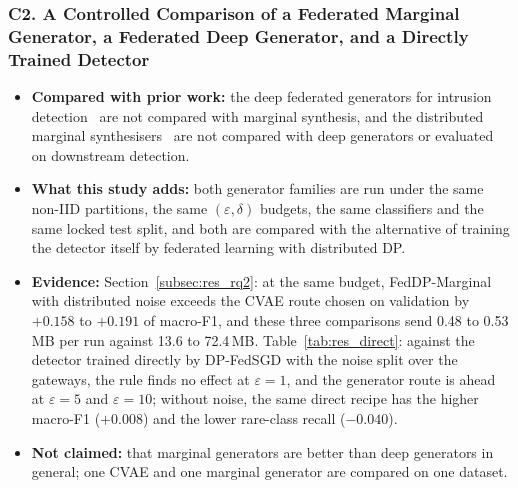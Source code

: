 \subsubsection*{C2. A Controlled Comparison of a Federated Marginal Generator, a Federated Deep Generator, and a Directly Trained Detector}
\begin{itemize}
    \item \textbf{Compared with prior work:} the deep federated generators for intrusion detection~\cite{hamouda2024, yao2024, he2023, salim2025, jiao2025, shettar2026} are not compared with marginal synthesis, and the distributed marginal synthesisers~\cite{maddock2024, pentyala2024, li2026} are not compared with deep generators or evaluated on downstream detection.
    \item \textbf{What this study adds:} both generator families are run under the same non-IID partitions, the same $(\varepsilon, \delta)$ budgets, the same classifiers and the same locked test split, and both are compared with the alternative of training the detector itself by federated learning with distributed DP.
    \item \textbf{Evidence:} Section~\ref{subsec:res_rq2}: at the same budget, FedDP-Marginal with distributed noise exceeds the CVAE route chosen on validation by $+0.158$ to $+0.191$ of macro-F1, and these three comparisons send 0.48 to 0.53\,MB per run against 13.6 to 72.4\,MB. Table~\ref{tab:res_direct}: against the detector trained directly by DP-FedSGD with the noise split over the gateways, the rule finds no effect at $\varepsilon = 1$, and the generator route is ahead at $\varepsilon = 5$ and $\varepsilon = 10$; without noise, the same direct recipe has the higher macro-F1 ($+0.008$) and the lower rare-class recall ($-0.040$).
    \item \textbf{Not claimed:} that marginal generators are better than deep generators in general; one CVAE and one marginal generator are compared on one dataset.
\end{itemize}

